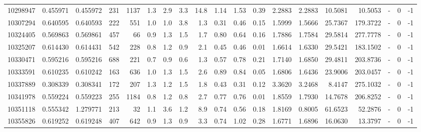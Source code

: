 \begin{tabular}{rrrrrrrrrrrrrrrrlrr}
  10298947 & 0.455971 &   0.455972 &  231 & 1137 &      1.3 &      2.9 &     3.3 &     14.8 &       1.14 &        1.53 &        0.39 &  2.2883 &  2.2883 &   10.5081 &   10.5053 &             - &        0 &         -1 \\
  10307294 & 0.640595 &   0.640593 &  222 &  551 &      1.0 &      1.0 &     3.8 &      1.3 &       0.31 &        0.46 &        0.15 &  1.5999 &  1.5666 &   25.7367 &  179.3722 &             - &        0 &         -1 \\
  10324405 & 0.569863 &   0.569861 &  457 &   66 &      0.9 &      1.3 &     1.5 &      1.7 &       0.80 &        0.64 &        0.16 &  1.7886 &  1.7584 &   29.5814 &  277.7778 &             - &        0 &         -1 \\
  10325207 & 0.614430 &   0.614431 &  542 &  228 &      0.8 &      1.2 &     0.9 &      2.1 &       0.45 &        0.46 &        0.01 &  1.6614 &  1.6330 &   29.5421 &  183.1502 &             - &        0 &         -1 \\
  10330471 & 0.595216 &   0.595216 &  688 &  221 &      0.7 &      0.9 &     0.6 &      1.3 &       0.57 &        0.78 &        0.21 &  1.7140 &  1.6850 &   29.4811 &  203.8736 &             - &        0 &         -1 \\
  10333591 & 0.610235 &   0.610242 &  163 &  636 &      1.0 &      1.3 &     1.5 &      2.6 &       0.89 &        0.84 &        0.05 &  1.6806 &  1.6436 &   23.9006 &  203.0457 &             - &        0 &         -1 \\
  10337889 & 0.308339 &   0.308341 &  172 &  207 &      1.3 &      1.2 &     1.5 &      1.8 &       0.43 &        0.31 &        0.12 &  3.3620 &  3.2468 &    8.4147 &  275.1032 &             - &        0 &         -1 \\
  10341978 & 0.559224 &   0.559223 &  255 & 1184 &      0.8 &      1.2 &     0.8 &      2.7 &       0.77 &        0.76 &        0.01 &  1.8559 &  1.7930 &   14.7678 &  206.8252 &             - &        0 &         -1 \\
  10351118 & 0.555342 &   1.279771 &  213 &   32 &      1.1 &      3.6 &     1.2 &      8.9 &       0.74 &        0.56 &        0.18 &  1.8169 &  0.8005 &   61.6523 &   52.2876 &             - &        0 &         -1 \\
  10355826 & 0.619252 &   0.619248 &  407 &  642 &      0.9 &      1.3 &     0.9 &      3.3 &       0.74 &        1.02 &        0.28 &  1.6771 &  1.6896 &   16.0630 &   13.3797 &             - &        0 &         -1 \\

\end{tabular}
